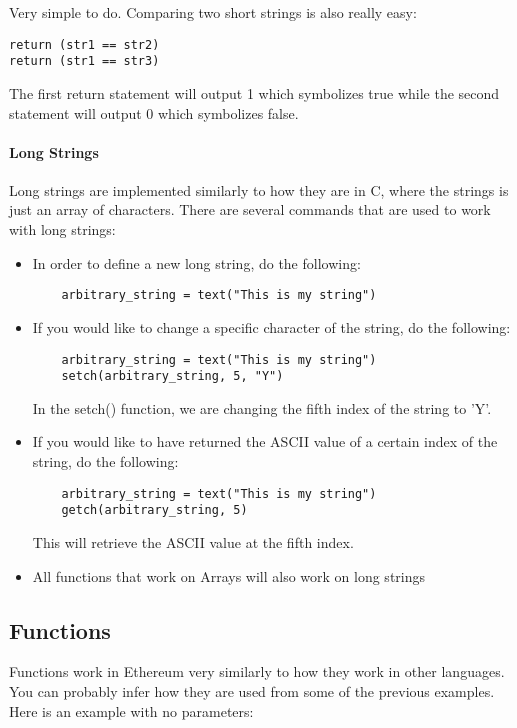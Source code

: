 \documentclass[12pt]{article}
\begin{document}
Very simple to do. Comparing two short strings is also really easy:

\begin{lstlisting}
return (str1 == str2)
return (str1 == str3)
\end{lstlisting}

The first return statement will output 1 which symbolizes true while the second statement will output 0 which symbolizes false. \cite{Serpent}

\paragraph{Long Strings}
Long strings are implemented similarly to how they are in C, where the strings is just an array of characters. There are several commands that are used to work with long strings:

\begin{itemize}
\item In order to define a new long string, do the following:
	\begin{lstlisting}
	arbitrary_string = text("This is my string")
	\end{lstlisting}
\item If you would like to change a specific character of the string, do the following:
	\begin{lstlisting}
	arbitrary_string = text("This is my string")
	setch(arbitrary_string, 5, "Y")
	\end{lstlisting}
	In the setch() function, we are changing the fifth index of the string to 'Y'.
\item If you would like to have returned the ASCII value of a certain index of the string, do the following:
	\begin{lstlisting}
	arbitrary_string = text("This is my string")
	getch(arbitrary_string, 5)
	\end{lstlisting}
	This will retrieve the ASCII value at the fifth index.
\item All functions that work on Arrays will also work on long strings
\end{itemize} \cite{Serpent,Serpent 1.0 (old)}
	
\subsection{Functions}
Functions work in Ethereum very similarly to how they work in other languages. You can probably infer how they are used from some of the previous examples. Here is an example with no parameters:
\end{document}

